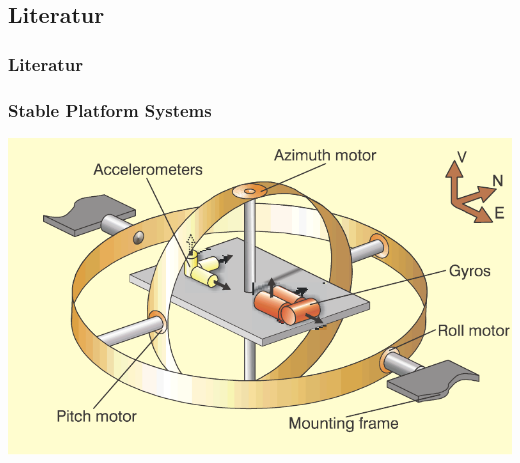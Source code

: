\documentclass[10pt,a4paper,oneside]{beamer}
\begin{document}
\begin{frame}
  \section{Literatur}
  \frametitle{Literatur}
\printbibliography

\end{frame}

\begin{frame}
	\frametitle{Stable Platform Systems}\cite{King98}
	\includegraphics[scale=0.55]{images/gimbal.png} 
\end{frame}
\end{document}
